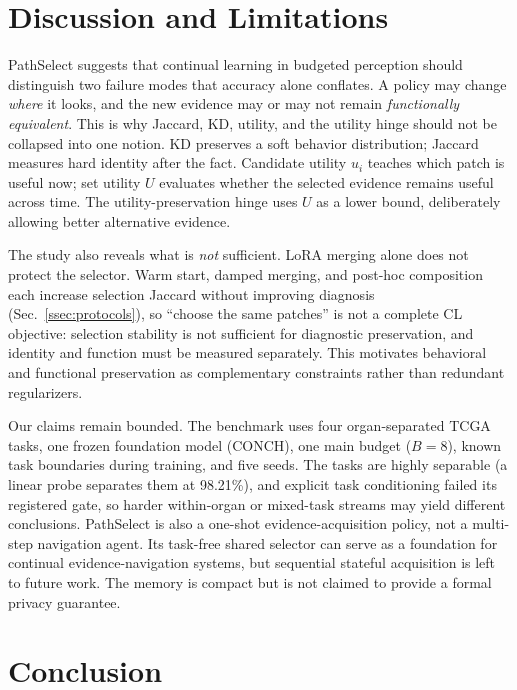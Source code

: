 \documentclass{article}
\begin{document}
\section{Discussion and Limitations}
\label{sec:discussion}

PathSelect suggests that continual learning in budgeted perception should distinguish two failure modes that accuracy alone conflates.
A policy may change \emph{where} it looks, and the new evidence may or may not remain \emph{functionally equivalent}.
This is why Jaccard, KD, utility, and the utility hinge should not be collapsed into one notion.
KD preserves a soft behavior distribution; Jaccard measures hard identity after the fact.
Candidate utility $u_i$ teaches which patch is useful now; set utility $U$ evaluates whether the selected evidence remains useful across time.
The utility-preservation hinge uses $U$ as a lower bound, deliberately allowing better alternative evidence.

The study also reveals what is \emph{not} sufficient.
LoRA merging alone does not protect the selector.
Warm start, damped merging, and post-hoc composition each increase selection Jaccard without improving diagnosis (Sec.~\ref{ssec:protocols}), so ``choose the same patches'' is not a complete CL objective: selection stability is not sufficient for diagnostic preservation, and identity and function must be measured separately.
This motivates behavioral and functional preservation as complementary constraints rather than redundant regularizers.

Our claims remain bounded.
The benchmark uses four organ-separated TCGA tasks, one frozen foundation model (CONCH), one main budget ($B=8$), known task boundaries during training, and five seeds.
The tasks are highly separable (a linear probe separates them at 98.21\%), and explicit task conditioning failed its registered gate, so harder within-organ or mixed-task streams may yield different conclusions.
PathSelect is also a one-shot evidence-acquisition policy, not a multi-step navigation agent.
Its task-free shared selector can serve as a foundation for continual evidence-navigation systems, but sequential stateful acquisition is left to future work. The memory is compact but is not claimed to provide a formal privacy guarantee.

\section{Conclusion}
\end{document}
